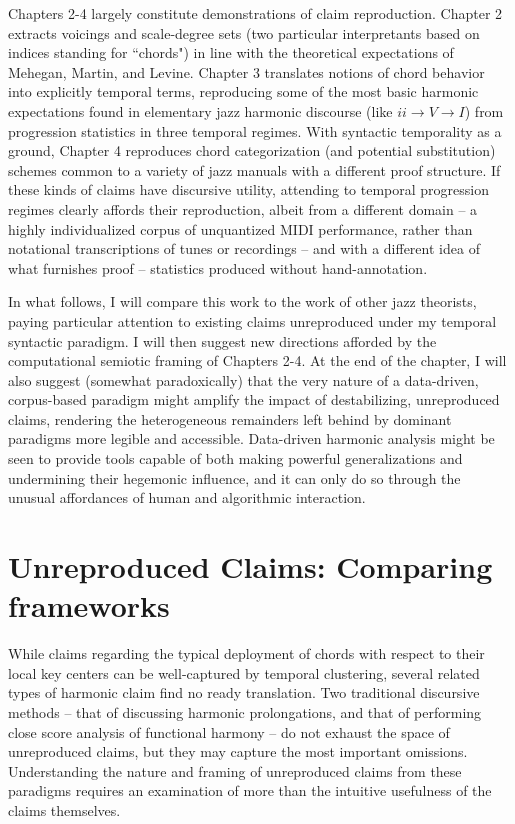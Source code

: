 Chapters 2-4 largely constitute demonstrations of claim reproduction.  Chapter 2 extracts voicings and scale-degree sets (two particular interpretants based on indices standing for ``chords") in line with the theoretical expectations of Mehegan, Martin, and Levine.  Chapter 3 translates notions of chord behavior into explicitly temporal terms, reproducing some of the most basic harmonic expectations found in elementary jazz harmonic discourse (like $ii \rightarrow V \rightarrow I$) from progression statistics in three temporal regimes.  With syntactic temporality as a ground, Chapter 4 reproduces chord categorization (and potential substitution) schemes common to a variety of jazz manuals with a different proof structure.  If these kinds of claims have discursive utility, attending to temporal progression regimes clearly affords their reproduction, albeit from a different domain -- a highly individualized corpus of unquantized MIDI performance, rather than notational transcriptions of tunes or recordings -- and with a different idea of what furnishes proof -- statistics produced without hand-annotation.

In what follows, I will compare this work to the work of other jazz theorists, paying particular attention to existing claims unreproduced under my temporal syntactic paradigm.  I will then suggest new directions afforded by the computational semiotic framing of Chapters 2-4.  At the end of the chapter, I will also suggest (somewhat paradoxically) that the very nature of a data-driven, corpus-based paradigm might amplify the impact of destabilizing, unreproduced claims, rendering the heterogeneous remainders left behind by dominant paradigms more legible and accessible.  Data-driven harmonic analysis might be seen to provide tools capable of both making powerful generalizations and undermining their hegemonic influence, and it can only do so through the unusual affordances of human and algorithmic interaction.

\section{Unreproduced Claims: Comparing frameworks}

While claims regarding the typical deployment of chords with respect to their local key centers can be well-captured by temporal clustering, several related types of harmonic claim find no ready translation.  Two traditional discursive methods -- that of discussing harmonic prolongations, and that of performing close score analysis of functional harmony -- do not exhaust the space of unreproduced claims, but they may capture the most important omissions.  Understanding the nature and framing of unreproduced claims from these paradigms requires an examination of more than the intuitive usefulness of the claims themselves.

